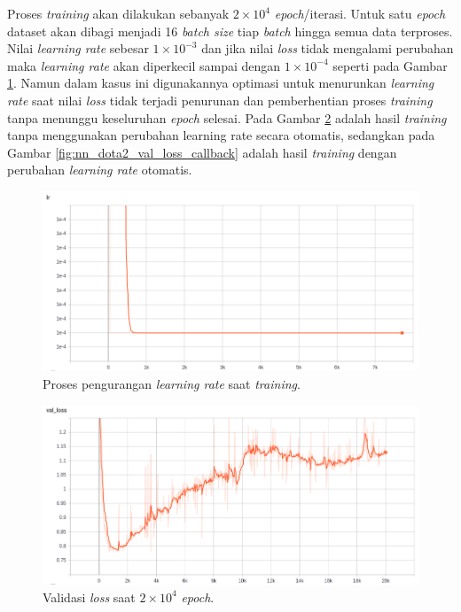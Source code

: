 Proses \textit{training} akan dilakukan sebanyak $2 \times 10^{4}$ \textit{epoch}/iterasi. Untuk satu \textit{epoch} dataset akan dibagi menjadi 16 \textit{batch size} tiap \textit{batch} hingga semua data terproses. Nilai \textit{learning rate} sebesar $1 \times 10^{-3}$ dan jika nilai \textit{loss} tidak mengalami perubahan maka \textit{learning rate} akan diperkecil sampai dengan $1 \times 10^{-4}$ seperti pada Gambar \ref{fig:nn_dota2_lr}. Namun dalam kasus ini digunakannya optimasi untuk menurunkan \textit{learning rate} saat nilai \textit{loss} tidak terjadi penurunan dan pemberhentian proses \textit{training} tanpa menunggu keseluruhan \textit{epoch} selesai. Pada Gambar \ref{fig:nn_dota2_val_loss_20k} adalah hasil \textit{training} tanpa menggunakan perubahan learning rate secara otomatis, sedangkan pada Gambar \ref{fig:nn_dota2_val_loss_callback} adalah hasil \textit{training} dengan perubahan \textit{learning rate} otomatis.
\vspace{1ex}

\begin{figure} [!htb] \centering
	\includegraphics[scale=0.3975]{img/callback_lr_chap3.png}
	\caption{Proses pengurangan \textit{learning rate} saat \textit{training}.}
	\label{fig:nn_dota2_lr}
	\vspace{1ex}
\end{figure}

\begin{figure} [!htb] \centering
	\includegraphics[scale=0.3975]{img/hyperparam_val_loss_chap3.png}
	\caption{Validasi \textit{loss} saat $2 \times 10^{4}$ \textit{epoch}.}
	\label{fig:nn_dota2_val_loss_20k}
	\vspace{1ex}
\end{figure}

